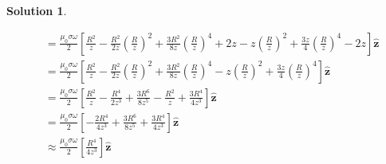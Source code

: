 \documentclass[10pt]{article}
\theoremstyle{definition}
\newtheorem{soln}{Solution}
\newcommand{\uz}{\hat{\mathbf{z}}}
\begin{document}
\begin{soln}
\begin{enumerate}[label=(\alph*)]
\begin{align*}
                           & =\frac{\mu_0 \sigma \omega }{2}\left[\frac{R^2}{z}-\frac{R^2}{2z}\left(\frac{R}{z}\right)^2+\frac{3R^2}{8z}\left(\frac{R}{z}\right)^4+2z-z\left(\frac{R}{z}\right)^2+\frac{3z}{4}\left(\frac{R}{z}\right)^4-2z\right]\uz                                               \\
                           & =\frac{\mu_0 \sigma \omega }{2}\left[\frac{R^2}{z}-\frac{R^2}{2z}\left(\frac{R}{z}\right)^2+\frac{3R^2}{8z}\left(\frac{R}{z}\right)^4-z\left(\frac{R}{z}\right)^2+\frac{3z}{4}\left(\frac{R}{z}\right)^4\right]\uz                                                     \\
                           & =\frac{\mu_0 \sigma \omega }{2}\left[\frac{R^2}{z}-\frac{R^4}{2z^3}+\frac{3R^6}{8z^5}-\frac{R^2}{z}+\frac{3R^4}{4z^3}\right]\uz                                                                                                                                        \\
                           & =\frac{\mu_0 \sigma \omega }{2}\left[-\frac{2R^4}{4z^3}+\frac{3R^6}{8z^5}+\frac{3R^4}{4z^3}\right]\uz                                                                                                                                                                  \\
                           & \approx\frac{\mu_0 \sigma \omega }{2}\left[\frac{R^4}{4z^3}\right]\uz
          \end{align*}
  \end{enumerate}
\end{soln}
\end{document}
